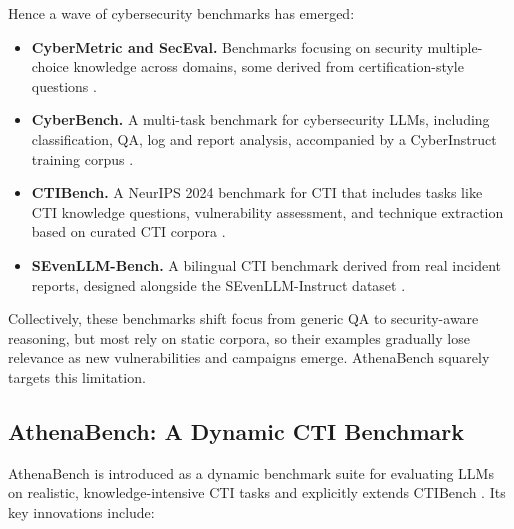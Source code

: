 \documentclass[unnumsec,webpdf,contemporary,large]{oup-authoring-template}
\theoremstyle{thmstyleone}
\theoremstyle{thmstyletwo}
\theoremstyle{thmstylethree}
\begin{document}
Hence a wave of cybersecurity benchmarks has emerged:

\begin{itemize}
  \item \textbf{CyberMetric and SecEval.} Benchmarks focusing on security multiple-choice knowledge across domains, some derived from certification-style questions \cite{liu2024cyberbench,hu2024seceval}.
  \item \textbf{CyberBench.} A multi-task benchmark for cybersecurity LLMs, including classification, QA, log and report analysis, accompanied by a CyberInstruct training corpus \cite{liu2024cyberbench}.
  \item \textbf{CTIBench.} A NeurIPS 2024 benchmark for CTI that includes tasks like CTI knowledge questions, vulnerability assessment, and technique extraction based on curated CTI corpora \cite{alam2024ctibench}.
  \item \textbf{SEvenLLM-Bench.} A bilingual CTI benchmark derived from real incident reports, designed alongside the SEvenLLM-Instruct dataset \cite{ji2024sevenllm}.
\end{itemize}

Collectively, these benchmarks shift focus from generic QA to security-aware reasoning, but most rely on static corpora, so their examples gradually lose relevance as new vulnerabilities and campaigns emerge. AthenaBench squarely targets this limitation.

\subsection{AthenaBench: A Dynamic CTI Benchmark}

AthenaBench is introduced as a dynamic benchmark suite for evaluating LLMs on realistic, knowledge-intensive CTI tasks and explicitly extends CTIBench \cite{alam2025athenabench,alam2024ctibench}. Its key innovations include:
\end{document}
